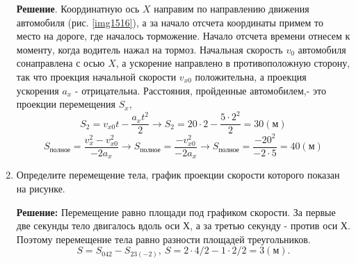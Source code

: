 \documentclass[a6paper, 11pt]{diss_4}
\renewcommand{\'}{\,'}
\begin{document}
\begin{enumerate}
{ \textbf{Решение}. Координатную ось $X$ направим по направлению движения
автомобиля (рис. \ref{img1516}), а за начало отсчета координаты примем то место на дороге,
где началось торможение. Начало отсчета времени отнесем к моменту, когда
водитель нажал на тормоз. Начальная скорость $v_0$ автомобиля сонаправлена с осью
$X$, а ускорение направлено в противоположную сторону, так что проекция начальной
скорости $v_{x0}$ положительна, а проекция ускорения $a_x$ - отрицательна. Расстояния,
пройденные автомобилем,- это проекции перемещения $S_x$,
\[
S_2=v_{x0}t-\frac{a_x t^2}{2}\to S_2=20\cdot 2-\frac{5\cdot 2^2}{2}=30(м)
\]
\[
S_{полное}=\frac{v_x^2-v_{x0}^2}{-2a_x}\to S_{полное}=\frac{-v_{x0}^2}{-2a_x}\to
S_{полное}=\frac{-20^2}{-2\cdot 5}=40(м)
\]
}
\item {
Определите перемещение тела, график проекции скорости которого показан на
рисунке.

 \textbf{Решение:} Перемещение равно площади под графиком скорости. За первые
две секунды тело двигалось вдоль оси $Х$, а за третью секунду - против оси $Х$.
Поэтому перемещение тела равно разности площадей треугольников.
\[
S = S_{042}-S_{23(-2)},\ S = 2\cdot 4/2-1\cdot 2/2= 3(м).
\]

}
\end{enumerate}
\end{document}
